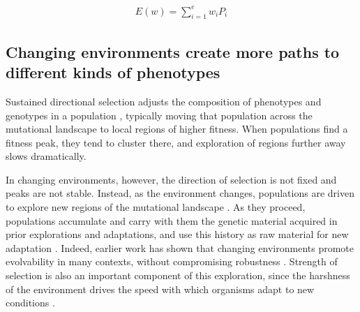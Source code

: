 \documentclass[10pt,letterpaper,final]{article}
\begin{document}
	\begin{eqnarray}
	\label{eq:expected_fitness_value}
		E(w) = \displaystyle\sum_{i=1}^{e} w_i P_i
	\end{eqnarray}

\subsection*{Changing environments create more paths to different kinds of phenotypes}
Sustained directional selection adjusts the composition of phenotypes and genotypes in a population \cite{wright_evolution_1931}, typically moving that population across the mutational landscape to local regions of higher fitness. When populations find a fitness peak, they tend to cluster there, and exploration of regions further away slows dramatically.

In changing environments, however, the direction of selection is not fixed and peaks are not stable.  Instead, as the environment changes, populations are driven to explore new regions of the mutational landscape \cite{kashtan_varying_2007,connelly_negative_2015}. As they proceed, populations accumulate and carry with them the genetic material acquired in prior explorations and adaptations, and use this history as raw material for new adaptation \cite{mcclintock_significance_1993}. Indeed, earlier work has shown that changing environments promote evolvability in many contexts, without compromising robustness \cite{crombach_evolution_2008,wilke_evolution_2001}. Strength of selection is also an important component of this exploration, since the harshness of the environment drives the speed with which organisms adapt to new conditions \cite{goddard_sex_2005}.
\end{document}
